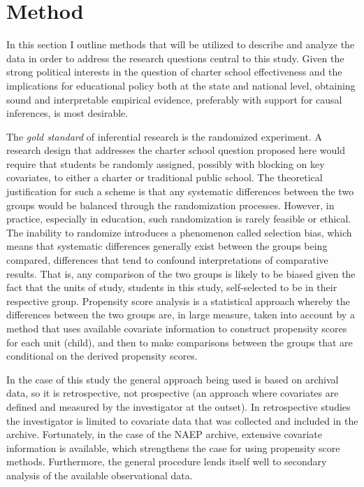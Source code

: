 \documentclass[letterpaper,12pt]{article}
\begin{document}
\section{Method}
In this section I outline methods that will be utilized to describe and analyze the data in order to address the research questions central to this study. Given the strong political interests in the question of charter school effectiveness and the implications for educational policy both at the state and national level, obtaining sound and interpretable empirical evidence, preferably with support for causal inferences, is most desirable. 

The \textit{gold standard} of inferential research is the randomized experiment. A research design that addresses the charter school question proposed here would require that students be randomly assigned, possibly with blocking on key covariates, to either a charter or traditional public school. The theoretical justification for such a scheme is that any systematic differences between the two groups would be balanced through the randomization processes. However, in practice, especially in education, such randomization is rarely feasible or ethical. The inability to randomize introduces a phenomenon called selection bias, which means that systematic differences generally exist between the groups being compared, differences that tend to confound interpretations of comparative results. That is, any comparison of the two groups is likely to be biased given the fact that the units of study, students in this study, self-selected to be in their respective group. Propensity score analysis \cite{RosenbaumRubin1983} is a statistical approach whereby the differences between the two groups are, in large measure, taken into account by a method that uses available covariate information to construct propensity scores for each unit (child), and then to make comparisons between the groups that are conditional on the derived propensity scores. 

In the case of this study the general approach being used is based on archival data, so it is retrospective, not prospective (an approach where covariates are defined and measured by the investigator at the outset). In retrospective studies the investigator is limited to covariate data that was collected and included in the archive. Fortunately, in the case of the NAEP archive, extensive covariate information is available, which strengthens the case for using propensity score methods. Furthermore, the general procedure lends itself well to secondary analysis of the available observational data.
\end{document}
